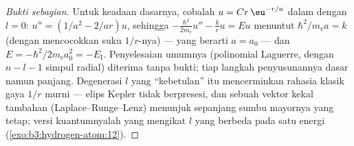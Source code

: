 \begin{proof}[Bukti sebagian]
Untuk keadaan dasarnya, cobalah $u = Cr\,\eu^{-r/a}$ dalam  dengan $l = 0$: $u'' = (1/a^2 - 2/ar)u$, sehingga
$-\tfrac{\hbar^2}{2m_{\text{e}}}u'' - \tfrac kr u = Eu$ menuntut
$\hbar^2/m_{\text{e}}a = k$ (dengan mencocokkan suku $1/r$-nya) --- yang
berarti $a = a_0$ --- dan $E = -\hbar^2/2m_{\text{e}}a_0^2 = -E_{\text{I}}$.
Penyelesaian umumnya (polinomial Laguerre, dengan $n - l - 1$ simpul
radial) diterima tanpa bukti; tiap langkah penyusunannya dasar namun
panjang. Degenerasi $l$ yang ``kebetulan'' itu mencerminkan rahasia
klasik gaya $1/r$ murni --- elips Kepler tidak berpresesi, dan sebuah
vektor kekal tambahan (Laplace--Runge--Lenz) menunjuk sepanjang sumbu
mayornya yang tetap; versi kuantumnyalah yang mengikat $l$ yang berbeda
pada satu energi (\cref{exo:b3:hydrogen-atom:12}).
\end{proof}

